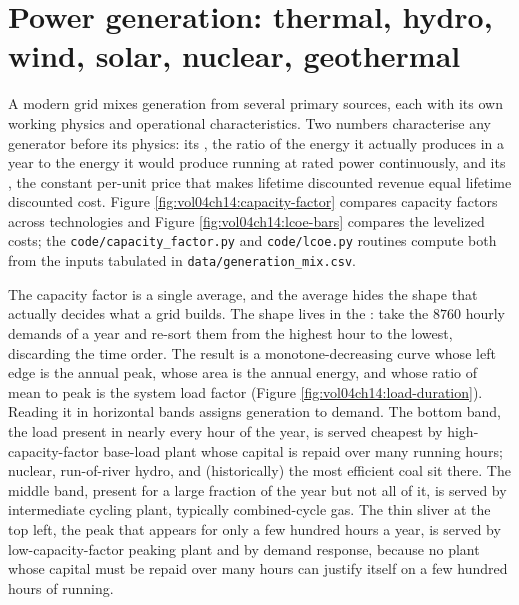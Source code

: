 \section{Power generation: thermal, hydro, wind, solar, nuclear, geothermal}

A modern grid mixes generation from several primary sources, each
with its own working physics and operational characteristics. Two
numbers characterise any generator before its physics: its
, the ratio of the energy it actually produces
in a year to the energy it would produce running at rated power
continuously, and its , the constant
per-unit price that makes lifetime discounted revenue equal lifetime
discounted cost. Figure \ref{fig:vol04ch14:capacity-factor} compares
capacity factors across technologies and Figure
\ref{fig:vol04ch14:lcoe-bars} compares the levelized costs; the
\texttt{code/capacity\_factor.py} and \texttt{code/lcoe.py} routines
compute both from the inputs tabulated in
\texttt{data/generation\_mix.csv}.





The capacity factor is a single average, and the average hides the shape
that actually decides what a grid builds. The shape lives in the
: take the $8760$ hourly demands of a year and
re-sort them from the highest hour to the lowest, discarding the time
order. The result is a monotone-decreasing curve whose left edge is the
annual peak, whose area is the annual energy, and whose ratio of mean to
peak is the system load factor (Figure
\ref{fig:vol04ch14:load-duration}). Reading it in horizontal bands assigns
generation to demand. The bottom band, the load present in nearly every
hour of the year, is served cheapest by high-capacity-factor base-load
plant whose capital is repaid over many running hours; nuclear, run-of-river
hydro, and (historically) the most efficient coal sit there. The middle
band, present for a large fraction of the year but not all of it, is served
by intermediate cycling plant, typically combined-cycle gas. The thin
sliver at the top left, the peak that appears for only a few hundred hours a
year, is served by low-capacity-factor peaking plant and by demand
response, because no plant whose capital must be repaid over many hours can
justify itself on a few hundred hours of running.

